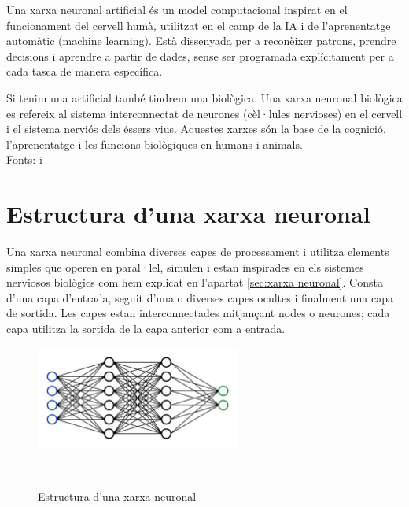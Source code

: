Una xarxa neuronal artificial és un model computacional inspirat en el funcionament del cervell humà, utilitzat en el camp de la IA i de l'aprenentatge automàtic (machine learning). Està dissenyada per a reconèixer patrons, prendre decisions i aprendre a partir de dades, sense ser programada explícitament per a cada tasca de manera específica.

Si tenim una artificial també tindrem una biològica. Una xarxa neuronal biològica es refereix al sistema interconnectat de neurones (cèl·lules nervioses) en el cervell i el sistema nerviós dels éssers vius. Aquestes xarxes són la base de la cognició, l'aprenentatge i les funcions biològiques en humans i animals.\\
Fonts: \cite{UOC} i \cite{XarxaBiologica}

\section{Estructura d'una xarxa neuronal}\label{sec:3.6}
Una xarxa neuronal combina diverses capes de processament i utilitza elements simples que operen en paral·lel, simulen i estan inspirades en els sistemes nerviosos biològics com hem explicat en l'apartat \ref{sec:xarxa neuronal}. Consta d'una capa d'entrada, seguit d'una o diverses capes ocultes i finalment una capa de sortida. Les capes estan interconnectades mitjançant nodes o neurones; cada capa utilitza la sortida de la capa anterior com a entrada.

\begin{figure}[h!]
    \centering
    \includegraphics[width=0.6\textwidth]{./figures/xarxa.png}
    \caption{Estructura d'una xarxa neuronal}~\cite{Img_estructura}
\end{figure}

